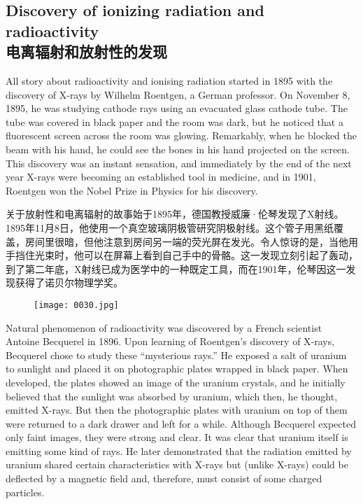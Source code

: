 \documentclass[dvipsnames, svgnames,a4paper,11pt]{article}
\begin{document}
\subsection{Discovery of ionizing radiation and radioactivity\\电离辐射和放射性的发现}

All story about radioactivity and ionising radiation started in 1895 with the discovery of X-rays by Wilhelm Roentgen, a German professor. On November 8, 1895, he was studying cathode rays using an evacuated glass cathode tube. The tube was covered in black paper and the room was dark, but he noticed that a fluorescent screen across the room was glowing. Remarkably, when he blocked the beam with his hand, he could see the bones in his hand projected on the screen. This discovery was an instant sensation, and immediately by the end of the next year X-rays were becoming an established tool in medicine, and in 1901, Roentgen won the Nobel Prize in Physics for his discovery.

关于放射性和电离辐射的故事始于1895年，德国教授威廉·伦琴发现了X射线。1895年11月8日，他使用一个真空玻璃阴极管研究阴极射线。这个管子用黑纸覆盖，房间里很暗，但他注意到房间另一端的荧光屏在发光。令人惊讶的是，当他用手挡住光束时，他可以在屏幕上看到自己手中的骨骼。这一发现立刻引起了轰动，到了第二年底，X射线已成为医学中的一种既定工具，而在1901年，伦琴因这一发现获得了诺贝尔物理学奖。

\begin{figure}[htbp]
      \centering
      \texttt{[image: 0030.jpg]}
       \label{fig16}
\end{figure}

Natural phenomenon of radioactivity was discovered by a French scientist Antoine Becquerel in 1896. Upon learning of Roentgen’s discovery of X-rays, Becquerel chose to study these “mysterious rays.” He exposed a salt of uranium to sunlight and placed it on photographic plates wrapped in black paper. When developed, the plates showed an image of the uranium crystals, and he initially believed that the sunlight was absorbed by uranium, which then, he thought, emitted X-rays. But then the photographic plates with uranium on top of them were returned to a dark drawer and left for a while. Although Becquerel expected only faint images, they were strong and clear. It was clear that uranium itself is emitting some kind of rays. He later demonstrated that the radiation emitted by uranium shared certain characteristics with X-rays but (unlike X-rays) could be deflected by a magnetic field and, therefore, must consist of some charged particles.
\end{document}
